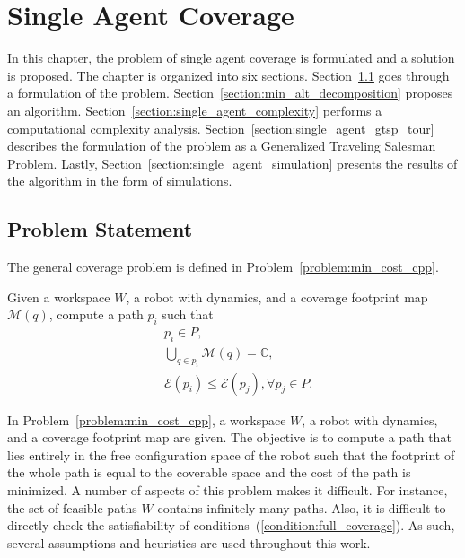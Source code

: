 \documentclass[../main.tex]{subfiles}
\begin{document}
\chapter{Single Agent Coverage}
\label{chapter:single_agent_coverage}

In this chapter, the problem of single agent coverage is formulated and a solution is proposed. The chapter is organized into six sections. Section~\ref{section:single_problem_statement} goes through a formulation of the problem. Section~\ref{section:min_alt_decomposition} proposes an algorithm. 
Section~\ref{section:single_agent_complexity} performs a computational complexity analysis. Section~\ref{section:single_agent_gtsp_tour} describes the formulation of the problem as a Generalized Traveling Salesman Problem. Lastly, Section~\ref{section:single_agent_simulation} presents the results of the algorithm in the form of simulations.

\section{Problem Statement}
\label{section:single_problem_statement}

The general coverage problem is defined in Problem~\ref{problem:min_cost_cpp}.
\begin{problem}
\label{problem:min_cost_cpp}
	Given a workspace $W$, a robot with dynamics, and a coverage footprint map $\mathcal{M}(q)$, compute a path $p_i$ such that
	\begin{equation}
	\label{condition:full_coverage}
	\begin{aligned}
		& p_i\in P,\\
		& \bigcup_{q\in p_i}\mathcal{M}(q)=\mathbb{C},\\
		& \mathcal{E}(p_i)\leq\mathcal{E}(p_j), \forall p_j\in P.
	\end{aligned}
	\end{equation}
\end{problem}

In Problem~\ref{problem:min_cost_cpp}, a workspace $W$, a robot with dynamics, and a coverage footprint map are given. The objective is to compute a path that lies entirely in the free configuration space of the robot such that the footprint of the whole path is equal to the coverable space and the cost of the path is minimized. A number of aspects of this problem makes it difficult. For instance, the set of feasible paths $W$ contains infinitely many paths. Also, it is difficult to directly check the satisfiability of conditions~(\ref{condition:full_coverage}). As such, several assumptions and heuristics are used throughout this work.
\end{document}

